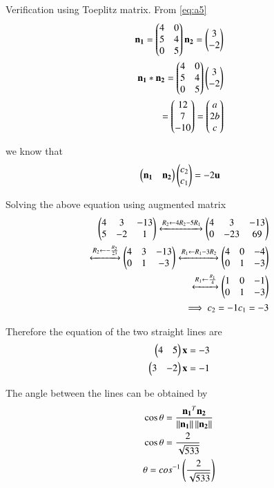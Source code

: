 \documentclass[journal,12pt,twocolumn]{IEEEtran}
\begin{document}
Verification using Toeplitz matrix. From \eqref{eq:a5} 
\begin{align}
\mathbf{n_1} = \begin{pmatrix}4 & 0 \\ 5 & 4 \\ 0 & 5 \end{pmatrix} 
\mathbf{n_2} = \begin{pmatrix}3 \\ -2\end{pmatrix}    \\
\mathbf{n_1}*\mathbf{n_2} = \begin{pmatrix}4 & 0 \\ 5 & 4 \\ 0 & 5 \end{pmatrix}\begin{pmatrix}3 \\ -2\end{pmatrix} \\ 
= \begin{pmatrix}12 \\ 7 \\ -10\end{pmatrix} = \begin{pmatrix}a \\ 2b \\ c\end{pmatrix}
\end{align}

we know that 
\begin{align}
&\begin{pmatrix}\mathbf{n_1} & \mathbf{n_2}\end{pmatrix}\begin{pmatrix}c_2 \\ c_1\end{pmatrix} = -2\mathbf{u} \\
\end{align}

Solving the above equation using augmented matrix
\begin{align}
\begin{pmatrix}4 & 3 & -13 \\ 5 & -2 & 1\end{pmatrix}
\xleftrightarrow[]{R_2 \leftarrow 4R_2-5R_1}
\begin{pmatrix}4 & 3 & -13 \\ 0 & -23 & 69\end{pmatrix}\\
\xleftrightarrow[]{R_2 \leftarrow -\frac{R_2}{23}}
\begin{pmatrix}4 & 3 & -13 \\ 0 & 1 & -3\end{pmatrix}
\xleftrightarrow[]{R_1 \leftarrow R_1-3R_2}
\begin{pmatrix}4 & 0 & -4 \\ 0 & 1 & -3\end{pmatrix}\\
\xleftrightarrow[]{R_1 \leftarrow \frac{R_1}{4}}
\begin{pmatrix}1 & 0 & -1 \\ 0 & 1 & -3\end{pmatrix} \\
\implies  c_2 = -1  c_1 = -3
\end{align}

Therefore the equation of the two straight lines are
\begin{align}
\begin{pmatrix}4 & 5\end{pmatrix}\mathbf{x} = -3 \\
\begin{pmatrix}3 &-2\end{pmatrix}\mathbf{x} = -1
\end{align}

The angle between the lines can be obtained by 
\begin{align}
&\cos \theta  = \frac{\mathbf{n_1}^T\mathbf{n_2}}{\left\lVert\mathbf{n_1}\right\rVert\left\lVert\mathbf{n_2}\right\rVert} \\
&\cos \theta  = \frac{2}{\sqrt{533}} \\
&\theta = cos^{-1}\left(\frac{2}{\sqrt{533}}\right)
\end{align}
\end{document}
